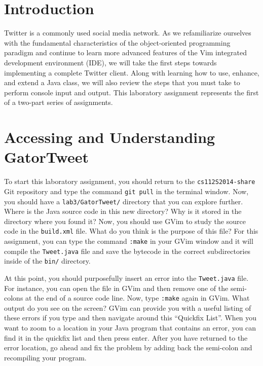 


\usepackage[compact]{titlesec}



\section*{Introduction}

Twitter is a commonly used social media network.  As we refamiliarize ourselves with the fundamental characteristics of the
object-oriented programming paradigm and continue to learn more advanced features of the Vim integrated development environment
(IDE), we will take the first steps towards implementing a complete Twitter client. Along with learning how to use, enhance, and
extend a Java class, we will also review the steps that you must take to perform console input and output. This laboratory
assignment represents the first of a two-part series of assignments. 

\section*{Accessing and Understanding GatorTweet}

To start this laboratory assignment, you should return to the {\tt cs112S2014-share} Git repository and type the command {\tt git
pull} in the terminal window.  Now, you should have a {\tt lab3/GatorTweet/} directory that you can explore further.  Where is the
Java source code in this new directory? Why is it stored in the directory where you found it? Now, you should use GVim to study
the source code in the {\tt build.xml} file.  What do you think is the purpose of this file? For this assignment, you can type the
command {\tt :make} in your GVim window and it will compile the {\tt Tweet.java} file and save the bytecode in the correct
subdirectories inside of the {\tt bin/} directory. 

At this point, you should purposefully insert an error into the {\tt Tweet.java} file.  For instance, you can open the file in
GVim and then remove one of the semi-colons at the end of a source code line. Now, type {\tt :make} again in GVim.  What output do
you see on the screen? GVim can provide you with a useful listing of these errors if you type {\tt <,q>} and then navigate around this
``Quickfix List''. When you want to zoom to a location in your Java program that contains an error, you can find it in the
quickfix list and then press enter.  After you have returned to the error location, go ahead and fix the problem by adding back
the semi-colon and recompiling your program. 

